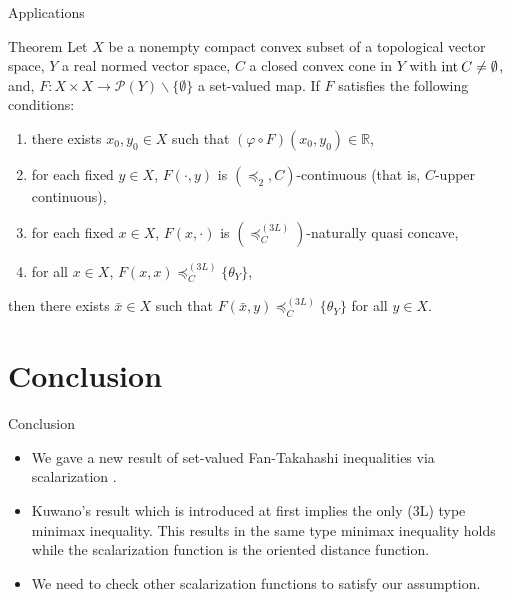 \documentclass[aspectratio=169, dvipdfmx, 11pt]{beamer}
\newcommand{\RealNumberSet}{\mathbb{R}}
\newcommand{\Interior}[1]{\text{\rm int\:${#1}$}} %
\begin{document}
\begin{frame}{Applications}
  \begin{block}{Theorem}
    Let $X$ be a nonempty compact convex subset of a topological vector space,
    $Y$ a real normed vector space, $C$ a closed convex cone in $Y$ with $\Interior{C} \ne \emptyset$,
    and, $F\colon X \times X \to \mathcal{P}(Y) \backslash \{\emptyset\}$ a set-valued map.
    If $F$ satisfies the following conditions:
    \begin{enumerate}
      \item there exists $x_0, y_0 \in X$ such that $(\varphi \circ F)(x_0,y_0) \in \RealNumberSet$,
      \item for each fixed $y \in X$, $F(\cdot,y)$ is $(\preccurlyeq_{2}, C)$-continuous (that is, $C$-upper continuous),
      \item for each fixed $x \in X$, $F(x,\cdot)$ is $(\preccurlyeq_{C}^{(3L)})$-naturally quasi concave,
      \item for all $x \in X$, $F(x,x) \preccurlyeq_{C}^{(3L)} \{\theta_{Y}\}$,
    \end{enumerate}
    then there exists $\bar{x} \in X$ such that $ F(\bar{x},y) \preccurlyeq_{C}^{(3L)} \{\theta_{Y}\} $ for all $y \in X$.
  \end{block}
\end{frame}


\section{Conclusion}

\begin{frame}{Conclusion}
  \begin{itemize}
    \item We gave a new result of set-valued Fan-Takahashi inequalities via scalarization  .
    \item Kuwano's result which is introduced at first implies the only (3L) type minimax inequality.
          This results in the same type minimax inequality holds
          while the scalarization function is the oriented distance function.
    \item We need to check other scalarization functions to satisfy our assumption.
  \end{itemize}
\end{frame}

\begin{frame}[allowframebreaks]
  \printbibliography
\end{frame}
\end{document}
